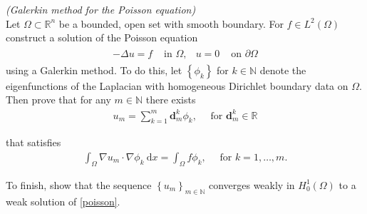 
\begin{exercise}

\textit{(Galerkin method for the Poisson equation)} \\
Let $\Omega \subset \mathbb{R}^{n}$ be a bounded, open set with smooth boundary.
For $f \in L^{2}(\Omega)$ construct a solution of the Poisson equation
\begin{align}\label{poisson}
  \begin{array}{llll}-\Delta u=f & \text { in } \Omega, & u=0 & \text { on } \partial \Omega\end{array}
\end{align}
using a Galerkin method. To do this, let $\left\{\phi_{k}\right\}$ for $k \in \mathbb{N}$ denote the eigenfunctions of the Laplacian with homogeneous Dirichlet boundary data on $\Omega .$ Then prove that for any $m \in \mathbb{N}$ there exists
\begin{align*}
  u_{m}=\sum_{k=1}^{m} \mathbf{d}_{m}^{k} \phi_{k}, \quad \text { for } \mathbf{d}_{m}^{k} \in \mathbb{R}
\end{align*}

that satisfies
\begin{align*}
  \int_{\Omega} \nabla u_{m} \cdot \nabla \phi_{k} \mathrm{~d}
  x=\int_{\Omega} f \phi_{k}, \quad \text { for } k=1, \ldots, m.
\end{align*}

To finish, show that the sequence $\left\{u_{m}\right\}_{m \in \mathbb{N}}$
converges weakly in $H_{0}^{1}(\Omega)$ to a weak solution of \eqref{poisson}.

\end{exercise}


